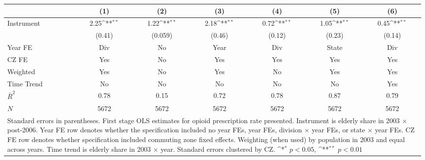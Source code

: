 {
\def\sym#1{\ifmmode^{#1}\else\(^{#1}\)\fi}
\begin{tabular}{l*{6}{c}}
\hline\hline
            &\multicolumn{1}{c}{(1)}        &\multicolumn{1}{c}{(2)}        &\multicolumn{1}{c}{(3)}        &\multicolumn{1}{c}{(4)}        &\multicolumn{1}{c}{(5)}        &\multicolumn{1}{c}{(6)}        \\
\hline
Instrument  &        2.25\sym{**}&        1.22\sym{**}&        2.18\sym{**}&        0.72\sym{**}&        1.05\sym{**}&        0.45\sym{**}\\
            &      (0.41)        &     (0.059)        &      (0.46)        &      (0.12)        &      (0.23)        &      (0.14)        \\
[1em]
\hline
Year FE     &          Div        &          No        &         Year        &          Div        &          State        &          Div        \\
CZ FE       &          Yes        &       No             &          Yes        &          Yes        &          Yes        &          Yes        \\
Weighted    &     Yes        &           No         &     Yes        &       No             &     Yes        &     Yes        \\
Time Trend    &     No        &           No         &     No        &       No             &     No        &     Yes        \\
\hline
$\bar{R}^2$ &        0.78        &        0.15        &        0.72        &        0.78        &        0.87        &        0.79        \\
$N$         &        5672        &        5672        &        5672        &        5672        &        5672        &        5672        \\
\hline\hline
\multicolumn{7}{p{0.6\linewidth}}{\footnotesize Standard errors in parentheses.  First stage OLS estimates for opioid prescription rate presented.  Instrument is elderly share in 2003 $\times$ post-2006.  Year FE row denotes whether the specification included no year FEs, year FEs, division $\times$ year FEs, or state $\times$ year FEs.  CZ FE row denotes whether specification included commuting zone fixed effects.  Weighting (when used) by population in 2003 and equal across years.  Time trend is elderly share in 2003 $\times$ year.  Standard errors clustered by CZ. \sym{*} \(p<0.05\), \sym{**} \(p<0.01\)}\\
\end{tabular}
}
